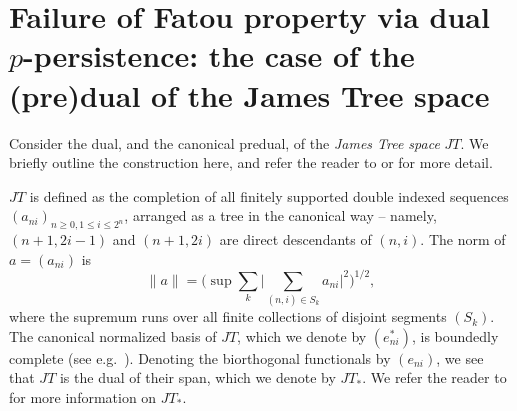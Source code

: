 \documentclass{amsart}
\theoremstyle{plain}
\theoremstyle{definition}
\newtheorem{remark}[theorem]{Remark}
\numberwithin{equation}{section}
\newcommand{\N}{\mathbb{N}}
\newcommand{\marg}[1]{\marginpar{\tiny #1}}     %
\newcommand{\timur}[1]{{\textcolor{blue}{{\bf T.O:} #1}}}
\DeclareMathOperator{\FBLp}{FBL^{\mathit{(p)}}}
\begin{document}

\section{Failure of Fatou property via dual $p$-persistence: the case of the (pre)dual of the James Tree space}\label{no m-b}\label{dual persistence}\label{james tree}


Consider the dual, and the canonical predual, of the \emph{James Tree space} $JT$. We briefly outline the construction here, and refer the reader to \cite{LiSt} or \cite[Section 15.4]{AK} for more detail.

$JT$ is defined as the completion of all finitely supported double indexed sequences $(a_{ni})_{n \geq 0, 1 \leq i \leq 2^n}$, arranged as a tree in the canonical way -- namely, $(n+1,2i-1)$ and $(n+1,2i)$ are direct descendants of $(n,i)$. The norm of $a = (a_{ni})$ is
\begin{equation}
	\|a\| = \big( \sup \sum_k \big| \sum_{(n,i) \in S_k} a_{ni} \big|^2 \big)^{1/2} ,
	\label{define:JT}
\end{equation}
where the supremum runs over all finite collections of disjoint segments $(S_k)$. %
The canonical normalized basis of $JT$, which we denote by $(e_{ni}^*)$, is boundedly complete (see e.g.~\cite[Proposition 15.4.4, Remark 15.4.5]{AK}). Denoting the biorthogonal functionals by $(e_{ni})$, we see that $JT$ is the dual of their span, which we denote by $JT_*$. We refer the reader to \cite{LiSt} for more information on $JT_*$.
\end{document}

